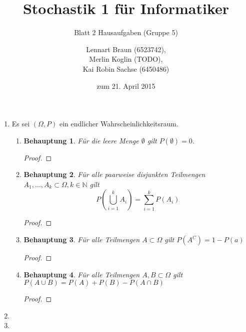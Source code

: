 \documentclass[a4paper]{scrartcl}
\title{Stochastik 1 für Informatiker}
\subtitle{Blatt 2 Hausaufgaben (Gruppe 5)}
\author{
    Lennart Braun (6523742), \\
    Merlin Koglin (TODO), \\
    Kai Robin Sachse (6450486)
}
\date{zum 21. April 2015}
\newtheorem*{behaupt}{Behauptung}
\begin{document}
\maketitle

\begin{enumerate}[label=\bfseries\arabic*.]
    \item Es sei $(\Omega, P)$ ein endlicher Wahrscheinlichkeitsraum.
        \begin{enumerate}[label=(\roman*)]
            \item
                \begin{behaupt}
                    Für die leere Menge $\emptyset$ gilt $P(\emptyset) = 0$.
                \end{behaupt}
                \begin{proof}
                    
                \end{proof}

            \item
                \begin{behaupt}
                    Für alle paarweise disjunkten Teilmengen
                    $A_1, \ldots, A_k \subset \Omega, k \in \mathbb{N}$ gilt
                    \begin{equation*}
                        P \left( \bigcup_{i=1}^k A_i \right)
                        = \sum_{i=1}^k P(A_i)
                    \end{equation*}
                    
                \end{behaupt}
                \begin{proof}
                    
                \end{proof}

            \item
                \begin{behaupt}
                    Für alle Teilmengen $A \subset \Omega$ gilt
                    $P(A^C) = 1 - P(a)$
                \end{behaupt}
                \begin{proof}
                    
                \end{proof}

            \setcounter{enumii}{4}
            \item
                \begin{behaupt}
                    Für alle Teilmengen $A, B \subset \Omega$ gilt
                    $P(A \cup B) = P(A) + P(B) - P(A \cap B)$
                \end{behaupt}
                \begin{proof}
                    
                \end{proof}

        \end{enumerate}


    \item

    \item

\end{enumerate}
\end{document}

